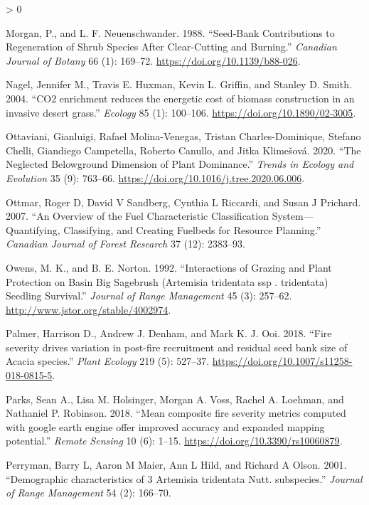 \documentclass[
  12pt,
]{article}
\newlength{\cslhangindent}
\newenvironment{CSLReferences}[2] %
 {%
  \setlength{\parindent}{0pt}
  \ifodd #1 \everypar{\setlength{\hangindent}{\cslhangindent}}\ignorespaces\fi
  \ifnum #2 > 0
  \setlength{\parskip}{#2\baselineskip}
  \fi
 }%
 {}
\begin{document}
\begin{CSLReferences}{1}{0}
\leavevmode\hypertarget{ref-Morgan1988}{}%
Morgan, P., and L. F. Neuenschwander. 1988. {``Seed-Bank Contributions
to Regeneration of Shrub Species After Clear-Cutting and Burning.''}
\emph{Canadian Journal of Botany} 66 (1): 169--72.
\url{https://doi.org/10.1139/b88-026}.

\leavevmode\hypertarget{ref-Nagel2004}{}%
Nagel, Jennifer M., Travis E. Huxman, Kevin L. Griffin, and Stanley D.
Smith. 2004. {``{CO2 enrichment reduces the energetic cost of biomass
construction in an invasive desert grass}.''} \emph{Ecology} 85 (1):
100--106. \url{https://doi.org/10.1890/02-3005}.

\leavevmode\hypertarget{ref-Ottaviani2020}{}%
Ottaviani, Gianluigi, Rafael Molina-Venegas, Tristan Charles-Dominique,
Stefano Chelli, Giandiego Campetella, Roberto Canullo, and Jitka
Klimešová. 2020. {``{The Neglected Belowground Dimension of Plant
Dominance}.''} \emph{Trends in Ecology and Evolution} 35 (9): 763--66.
\url{https://doi.org/10.1016/j.tree.2020.06.006}.

\leavevmode\hypertarget{ref-Ottmar2007}{}%
Ottmar, Roger D, David V Sandberg, Cynthia L Riccardi, and Susan J
Prichard. 2007. {``An Overview of the Fuel Characteristic Classification
System---Quantifying, Classifying, and Creating Fuelbeds for Resource
Planning.''} \emph{Canadian Journal of Forest Research} 37 (12):
2383--93.

\leavevmode\hypertarget{ref-Owens1992}{}%
Owens, M. K., and B. E. Norton. 1992. {``{Interactions of Grazing and
Plant Protection on Basin Big Sagebrush (Artemisia tridentata ssp .
tridentata) Seedling Survival}.''} \emph{Journal of Range Management} 45
(3): 257--62. \url{http://www.jstor.org/stable/4002974}.

\leavevmode\hypertarget{ref-Palmer2018}{}%
Palmer, Harrison D., Andrew J. Denham, and Mark K. J. Ooi. 2018.
{``{Fire severity drives variation in post-fire recruitment and residual
seed bank size of Acacia species}.''} \emph{Plant Ecology} 219 (5):
527--37. \url{https://doi.org/10.1007/s11258-018-0815-5}.

\leavevmode\hypertarget{ref-Parks2018}{}%
Parks, Sean A., Lisa M. Holsinger, Morgan A. Voss, Rachel A. Loehman,
and Nathaniel P. Robinson. 2018. {``{Mean composite fire severity
metrics computed with google earth engine offer improved accuracy and
expanded mapping potential}.''} \emph{Remote Sensing} 10 (6): 1--15.
\url{https://doi.org/10.3390/rs10060879}.

\leavevmode\hypertarget{ref-Perryman2001}{}%
Perryman, Barry L, Aaron M Maier, Ann L Hild, and Richard A Olson. 2001.
{``{Demographic characteristics of 3 Artemisia tridentata Nutt.
subspecies}.''} \emph{Journal of Range Management} 54 (2): 166--70.


\end{CSLReferences}
\end{document}
